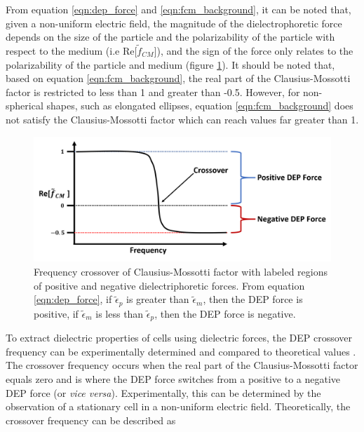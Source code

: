 \par From equation \ref{eqn:dep_force} and \ref{eqn:fcm_background}, it can be noted that, given a non-uniform electric field, the magnitude of the dielectrophoretic force depends on the size of the particle and the polarizability of the particle with respect to the medium (i.e Re$\big[\tilde{f}_{CM}\big]$), and the sign of the force only relates to the polarizability of the particle and medium (figure \ref{fig:freq_crossover}). It should be noted that, based on equation \ref{eqn:fcm_background}, the real part of the Clausius-Mossotti factor is restricted to less than 1 and greater than -0.5. However, for non-spherical shapes, such as elongated ellipses, equation \ref{eqn:fcm_background} does not satisfy the Clausius-Mossotti factor which can reach values far greater than 1.  


\begin{figure}[ht]
 \centering
 \includegraphics[width=\textwidth]{images/DEPCrossover.png}
 \caption[Frequency crossover of Clausius-Mossotti factor] {Frequency crossover of Clausius-Mossotti factor with labeled regions of positive and negative dielectriphoretic forces. From equation \ref{eqn:dep_force}, if $\tilde{\epsilon}_p$ is greater than $\tilde{\epsilon}_m$, then the DEP force is positive, if $\tilde{\epsilon}_m$ is less than $\tilde{\epsilon}_p$, then the DEP force is negative.}
 \label{fig:freq_crossover}
\end{figure}
 
 \par To extract dielectric properties of cells using dielectric forces, the DEP crossover frequency can be experimentally determined and compared to theoretical values \cite{morgan_single_2007}. The crossover frequency occurs when the real part of the Clausius-Mossotti factor equals zero and is where the DEP force switches from a positive to a negative DEP force (or \textit{vice versa}). Experimentally, this can be determined by the observation of a stationary cell in a non-uniform electric field. Theoretically, the crossover frequency can be described as
 
